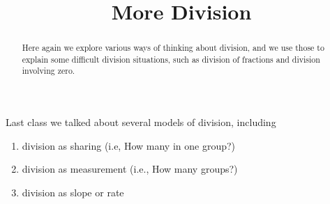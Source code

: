 \documentclass{ximera}
\title{More Division}
\begin{document}
\begin{abstract}
Here again we explore various ways of thinking about division, and we use those to explain some difficult division situations, such as division of fractions and division involving zero.
\end{abstract}
\maketitle


%
%
%

Last class we talked about several models of division, including 
\begin{enumerate}
\item division as sharing (i.e, How many in one group?)
\item division as measurement (i.e., How many groups?)
\item division as slope or rate
\end{enumerate}
\end{document}
